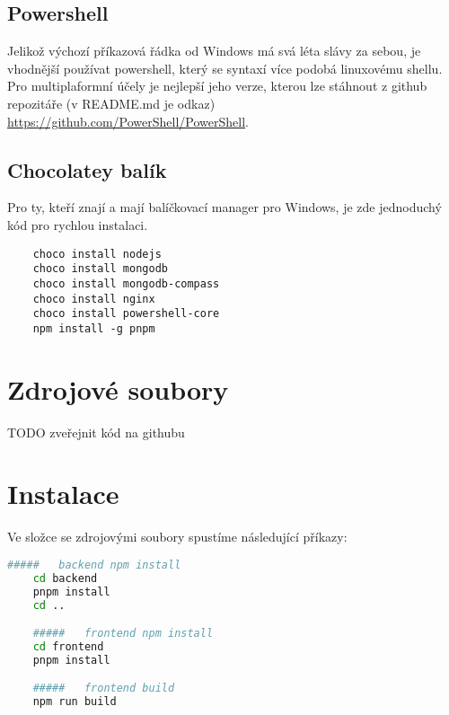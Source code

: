 \subsection{Powershell}
Jelikož výchozí příkazová řádka od Windows má svá léta slávy za sebou, je
vhodnější používat powershell, který se syntaxí více podobá linuxovému shellu.
Pro multiplaformní účely je nejlepší jeho  verze, kterou lze stáhnout
z github repozitáře (v README.md je odkaz) \url{https://github.com/PowerShell/PowerShell}.

\subsection{Chocolatey balík}
Pro ty, kteří znají a mají balíčkovací manager  pro Windows, je zde
jednoduchý kód pro rychlou instalaci.
\begin{lstlisting}
	choco install nodejs
	choco install mongodb
	choco install mongodb-compass
	choco install nginx
	choco install powershell-core
	npm install -g pnpm
\end{lstlisting}

\section{Zdrojové soubory}
TODO zveřejnit kód na githubu

\section{Instalace}
Ve složce se zdrojovými soubory spustíme následující příkazy:
\begin{lstlisting}[language=bash]
	#####   backend npm install
	cd backend
	pnpm install
	cd ..

	#####   frontend npm install
	cd frontend
	pnpm install

	#####   frontend build
	npm run build
\end{lstlisting}

